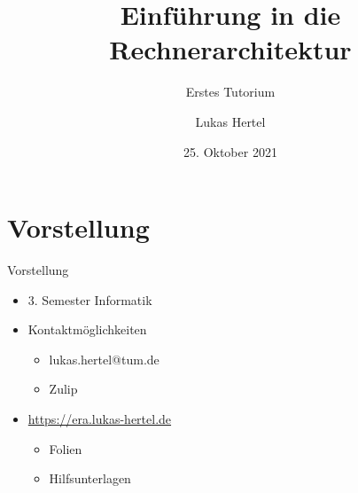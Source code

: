 \documentclass[
  german,            %
  aspectratio=169,    %
  sectionpage=false,   %
]{tumbeamer}
\title{Einführung in die Rechnerarchitektur}
\subtitle{Erstes Tutorium}
\author{Lukas Hertel}
\institute{\theChairName\\\theDepartmentName\\\theUniversityName}
\date[25.10.2021]{25. Oktober 2021}
\begin{document}
\maketitle

\section{Vorstellung}
\begin{frame}{Vorstellung}
  \begin{itemize}
    \item 3. Semester Informatik
    \item Kontaktmöglichkeiten
    \begin{itemize}
        \item lukas.hertel@tum.de
        \item Zulip
    \end{itemize}
    \item \url{https://era.lukas-hertel.de}
    \begin{itemize}
    	\item Folien
    	\item Hilfsunterlagen
    \end{itemize}
  \end{itemize}
\end{frame}
\end{document}
